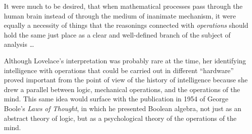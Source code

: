 \documentclass[version=last,draft=false,paper=A4,portrait,twoside=true,twocolumn=false,headinclude=false,footinclude=false,mpinclude=true,fontsize=12,BCOR=20mm,DIV=calc,pagesize=auto,open=right,chapterprefix=true,numbers=autoendperiod,headsepline=false,headings=twolinechapter,parskip=false]{scrbook}
\begin{document}
\begin{displayquote}
It were much to be desired, that when mathematical processes pass through
the human brain instead of through the medium of inanimate mechanism, it
were equally a necessity of things that the reasonings connected with
\emph{operations} should hold the same just place as a clear and well-defined
branch of the subject of analysis \ldots
\end{displayquote}

Although Lovelace's interpretation was probably rare at the time, her
identifying intelligence with operations that could be carried out in
different ``hardware'' proved important from the point of view of the
history of intelligence because she drew a parallel between logic,
mechanical operations, and the operations of the mind. This same idea would
surface with the publication in 1954 of George Boole's \emph{Laws of Thought}, in
which he presented Boolean algebra, not just as an abstract  theory of
logic, but as a psychological theory of the operations of the mind. 
\end{document}
